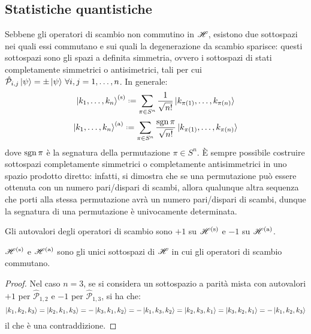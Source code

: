 \subsection{Statistiche quantistiche}

Sebbene gli operatori di scambio non commutino in $ \mathscr{H} $, esistono due sottospazi nei quali essi commutano e sui quali la degenerazione da scambio sparisce: questi sottospazi sono gli spazi a definita simmetria, ovvero i sottospazi di stati completamente simmetrici o antisimetrici, tali per cui $ \hat{\mathcal{P}}_{i,j} \ket{\psi} = \pm \ket{\psi} \,\forall i,j = 1, \dots, n $. In generale:
\begin{equation}
	\ket{k_1, \dots, k_n}^{(\mathrm{s})} \defeq \sum_{\pi \in S^n} \frac{1}{\sqrt{n!}} \ket{k_{\pi(1)}, \dots, k_{\pi(n)}}
	\label{eq:6.6}
\end{equation}
\begin{equation}
	\ket{k_1, \dots, k_n}^{(\mathrm{a})} \defeq \sum_{\pi \in S^n} \frac{\sgn{\pi}}{\sqrt{n!}} \ket{k_{\pi(1)}, \dots, k_{\pi(n)}}
	\label{eq:6.7}
\end{equation}
dove $ \mathrm{sgn}\,\pi $ è la segnatura della permutazione $ \pi \in S^n $. È sempre possibile costruire sottospazi completamente simmetrici o completamente antisimmetrici in uno spazio prodotto diretto: infatti, si dimostra che se una permutazione può essere ottenuta con un numero pari/dispari di scambi, allora qualunque altra sequenza che porti alla stessa permutazione avrà un numero pari/dispari di scambi, dunque la segnatura di una permutazione è univocamente determinata.

\begin{proposition}
	Gli autovalori degli operatori di scambio sono $ +1 $ su $ \mathscr{H}^{(\mathrm{s})} $ e $ -1 $ su $ \mathscr{H}^{(\mathrm{a})} $.
\end{proposition}

\begin{theorem}
	$ \mathscr{H}^{(\mathrm{s})} $ e $ \mathscr{H}^{(\mathrm{a})} $ sono gli unici sottospazi di $ \mathscr{H} $ in cui gli operatori di scambio commutano.
\end{theorem}
\begin{proof}
	Nel caso $ n = 3 $, se si considera un sottospazio a parità mista con autovalori $ +1 $ per $ \hat{\mathcal{P}}_{1,2} $ e $ -1 $ per $ \hat{\mathcal{P}}_{1,3} $, si ha che:
	\begin{equation*}
		\ket{k_1, k_2, k_3} = \ket{k_2, k_1, k_3} = - \ket{k_3, k_1, k_2} = - \ket{k_1, k_3, k_2} = \ket{k_2, k_3, k_1} = \ket{k_3, k_2, k_1} = - \ket{k_1, k_2, k_3}
	\end{equation*}
	il che è una contraddizione.
\end{proof}

